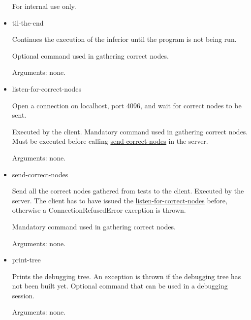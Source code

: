 \begin{itemize}
For internal use only.
\item til-the-end
\label{command:til-the-end}

Continues the execution of the inferior until the program is not being run.

Optional command used in gathering correct nodes.

Arguments: none.
\item listen-for-correct-nodes
\label{command:listen-for-correct-nodes}

Open a connection on localhost, port 4096, and wait for correct nodes to be sent.

Executed by the client.
Mandatory command used in gathering correct nodes.
Must be executed before calling \hyperref[command:send-correct-nodes]{send-correct-nodes} in the server.

Arguments: none.
\item send-correct-nodes
\label{command:send-correct-nodes}

Send all the correct nodes gathered from tests to the client.
Executed by the server.
The client has to have issued the \hyperref[command:listen-for-correct-nodes]{listen-for-correct-nodes} before, otherwise a ConnectionRefusedError exception is thrown.

Mandatory command used in gathering correct nodes.

Arguments: none.
\item print-tree
\label{command:print-tree}

Prints the debugging tree.
An exception is thrown if the debugging tree has not been built yet.
Optional command that can be used in a debugging session.

Arguments: none.
\end{itemize}
